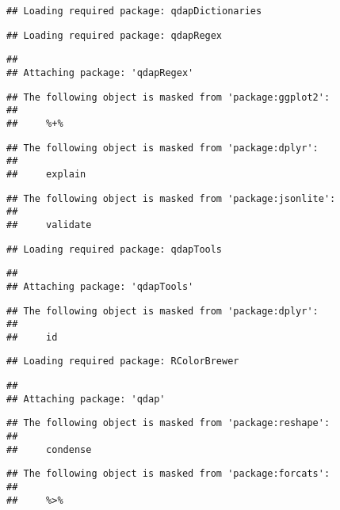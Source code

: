 \documentclass[]{article}
\begin{document}
\begin{verbatim}
## Loading required package: qdapDictionaries
\end{verbatim}

\begin{verbatim}
## Loading required package: qdapRegex
\end{verbatim}

\begin{verbatim}
## 
## Attaching package: 'qdapRegex'
\end{verbatim}

\begin{verbatim}
## The following object is masked from 'package:ggplot2':
## 
##     %+%
\end{verbatim}

\begin{verbatim}
## The following object is masked from 'package:dplyr':
## 
##     explain
\end{verbatim}

\begin{verbatim}
## The following object is masked from 'package:jsonlite':
## 
##     validate
\end{verbatim}

\begin{verbatim}
## Loading required package: qdapTools
\end{verbatim}

\begin{verbatim}
## 
## Attaching package: 'qdapTools'
\end{verbatim}

\begin{verbatim}
## The following object is masked from 'package:dplyr':
## 
##     id
\end{verbatim}

\begin{verbatim}
## Loading required package: RColorBrewer
\end{verbatim}

\begin{verbatim}
## 
## Attaching package: 'qdap'
\end{verbatim}

\begin{verbatim}
## The following object is masked from 'package:reshape':
## 
##     condense
\end{verbatim}

\begin{verbatim}
## The following object is masked from 'package:forcats':
## 
##     %>%
\end{verbatim}
\end{document}
